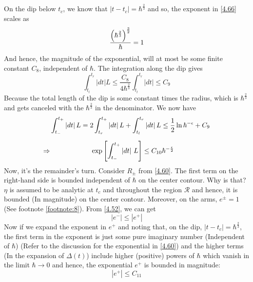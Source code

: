 \documentclass[12pt,a4paper]{article}
\begin{document}
	On the dip below $t_{c}$, we know that $\left| t - t_{c} \right| = \hbar^{\frac{2}{3}}$ and so, the exponent in \eqref{4.66} scales as
	\begin{equation}
		\frac{\left( \hbar^{\frac{2}{3}} \right)^{\frac{3}{2}}}{\hbar} = 1 \notag
	\end{equation}
	And hence, the magnitude of the exponential, will at most be some finite constant $C_{8}$, independent of $\hbar$. The integration along the dip gives
	\begin{equation}
		\int_{t_{l}}^{t_{r}} \left| dt \right| L \leq \dfrac{C_{8}}{4\hbar^{\frac{2}{3}}} \int_{t_{l}}^{t_{r}} \left| dt \right| \leq C_{9} \label{4.68}
	\end{equation}
	Because the total length of the dip is some constant times the radius, which is $\hbar^{\frac{2}{3}}$ and gets canceled with the $\hbar^{\frac{2}{3}}$ in the denominator. We now have
	\begin{align}
		&\int_{t_{-}}^{t_{+}} \left| dt \right| L = 2 \int_{t_{r}}^{t_{+}} \left| dt \right| L + \int_{t_{l}}^{t_{r}} \left| dt \right| L \leq \frac{1}{2}\ln \hbar^{-\epsilon} + C_{9} \notag \\[5pt]
		\Rightarrow& \qquad \qquad \qquad \exp\left[ \int_{t_{-}}^{t_{+}} \left| dt \right|\, L \right] \leq C_{10} \hbar^{-\frac{\epsilon}{2}} \label{4.69}
	\end{align}
	Now, it's the remainder's turn. Consider $R_{\pm}$ from \eqref{4.60}. The first term on the right-hand side is bounded independent of $\hbar$ on the center contour. Why is that? $\eta$ is assumed to be analytic at $t_{c}$ and throughout the region $\mathcal{R}$ and hence, it is bounded (In magnitude) on the center contour. Moreover, on the arms, $e^{\pm} = 1$ (See footnote \ref{footnote:8}). From \eqref{4.52}, we can get
	\begin{equation}
		\left| e^{-} \right| \leq \left| e^{+} \right| \label{4.70}
	\end{equation}
	Now if we expand the exponent in $e^{+}$ and noting that, on the dip, $\left| t - t_{c} \right| = \hbar^{\frac{2}{3}}$, the first term in the exponent is just some pure imaginary number (Independent of $\hbar$) (Refer to the discussion for the exponential in \eqref{4.60}) and the higher terms (In the expansion of $\Delta(t)$) include higher (positive) powers of $\hbar$ which vanish in the limit $\hbar \rightarrow 0$ and hence, the exponential $e^{+}$ is bounded in magnitude:
	\begin{equation}
		\left| e^{+} \right| \leq C_{11} \label{4.71}
	\end{equation}
\end{document}
